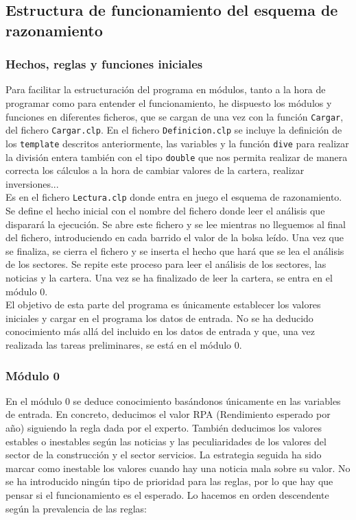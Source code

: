 \documentclass[11pt,leqno]{article}
\theoremstyle{definition_wo_parentheses}
\theoremstyle{plain}
\theoremstyle{remark}
\begin{document}
\subsection{Estructura de funcionamiento del esquema de razonamiento}

\subsubsection{Hechos, reglas y funciones iniciales}
	
	Para facilitar la estructuración del programa en módulos, tanto a la hora de programar como para entender el funcionamiento, he dispuesto los módulos y funciones en diferentes ficheros, que se cargan de una vez con la función \texttt{Cargar}, del fichero \texttt{Cargar.clp}. En el fichero \texttt{Definicion.clp} se incluye la definición de los \texttt{template} descritos anteriormente, las variables y la función \texttt{dive} para realizar la división entera también con el tipo \texttt{double} que nos permita realizar de manera correcta los cálculos a la hora de cambiar valores de la cartera, realizar inversiones...\\
	Es en el fichero \texttt{Lectura.clp} donde entra en juego el esquema de razonamiento. Se define el hecho inicial con el nombre del fichero donde leer el análisis que disparará la ejecución. Se abre este fichero y se lee mientras no lleguemos al final del fichero, introduciendo en cada barrido el valor de la bolsa leído. Una vez que se finaliza, se cierra el fichero y se inserta el hecho que hará que se lea el análisis de los sectores. Se repite este proceso para leer el análisis de los sectores, las noticias y la cartera. Una vez se ha finalizado de leer la cartera, se entra en el módulo 0.\\
	
	El objetivo de esta parte del programa es únicamente establecer los valores iniciales y cargar en el programa los datos de entrada. No se ha deducido conocimiento más allá del incluido en los datos de entrada y que, una vez realizada las tareas preliminares, se está en el módulo 0.

	
\subsubsection{Módulo 0}
	
	En el módulo 0 se deduce conocimiento basándonos únicamente en las variables de entrada. En concreto, deducimos el valor RPA (Rendimiento esperado por año) siguiendo la regla dada por el experto. También deducimos los valores estables o inestables según las noticias y las peculiaridades de los valores del sector de la construcción y el sector servicios. La estrategia seguida ha sido marcar como inestable los valores cuando hay una noticia mala sobre su valor. No se ha introducido ningún tipo de prioridad para las reglas, por lo que hay que pensar si el funcionamiento es el esperado. Lo hacemos en orden descendente según la prevalencia de las reglas:
	
\end{document}
